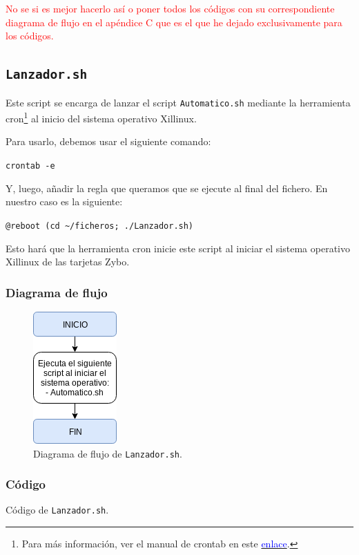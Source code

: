 \textcolor{red}{No se si es mejor hacerlo así o poner todos los códigos con su correspondiente diagrama de flujo en el apéndice C que es el que he dejado exclusivamente para los códigos.}


\subsection{\texttt{Lanzador.sh}}
Este script se encarga de lanzar el script \texttt{Automatico.sh} mediante la herramienta cron\footnote{Para más información, ver el manual de crontab en este \href{https://linux.die.net/man/5/crontab}{\textcolor{blue}{enlace}}.} al inicio del sistema operativo Xillinux.

Para usarlo, debemos usar el siguiente comando:
\begin{center}
	\texttt{crontab -e}
\end{center}

Y, luego, añadir la regla que queramos que se ejecute al final del fichero. En nuestro caso es la siguiente:
\begin{center}
	\texttt{@reboot (cd \textasciitilde/ficheros; ./Lanzador.sh)}
\end{center}

Esto hará que la herramienta cron inicie este script al iniciar el sistema operativo Xillinux de las tarjetas Zybo.

\newpage
\subsubsection{Diagrama de flujo}
\begin{figure}[h]
	\centering
	\includegraphics[scale=0.9]{Anexos/Anexo3/Diagramas/Lanzador.png}
	\caption{Diagrama de flujo de \texttt{Lanzador.sh}.}
	\label{Diagrama de flujo de Lanzador.sh}
\end{figure}

\subsubsection{Código}

\begin{center}
	Código de \texttt{Lanzador.sh}.
\end{center}



